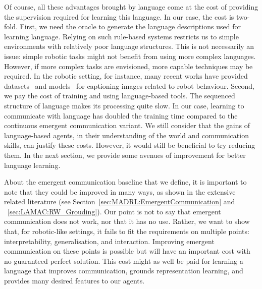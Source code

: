 Of course, all these advantages brought by language come at the cost of providing the supervision required for learning this language. In our case, the cost is two-fold. First, we need the oracle to generate the language descriptions used for learning language. Relying on such rule-based systems restricts us to simple environments with relatively poor language structures. This is not necessarily an issue: simple robotic tasks might not benefit from using more complex languages. However, if more complex tasks are envisioned, more capable techniques may be required. In the robotic setting, for instance, many recent works have provided datasets~\citep{Nair2021_LORL} and models~\citep{Zeng2022_Socratic} for captioning images related to robot behaviour. Second, we pay the cost of training and using language-based tools. The sequenced structure of language makes its processing quite slow. In our case, learning to communicate with language has doubled the training time compared to the continuous emergent communication variant. We still consider that the gains of language-based agents, in their understanding of the world and communication skills, can justify these costs. However, it would still be beneficial to try reducing them. In the next section, we provide some avenues of improvement for better language learning.

About the emergent communication baseline that we define, it is important to note that they could be improved in many ways, as shown in the extensive related literature (see Section~\ref{sec:MADRL:EmergentCommunication} and ~\ref{sec:LAMAC:RW_Grouding}). Our point is not to say that emergent communication does not work, nor that it has no use. Rather, we want to show that, for robotic-like settings, it fails to fit the requirements on multiple points: interpretability, generalisation, and interaction. Improving emergent communication on these points is possible but will have an important cost with no guaranteed perfect solution. This cost might as well be paid for learning a language that improves communication, grounds representation learning, and provides many desired features to our agents. 

